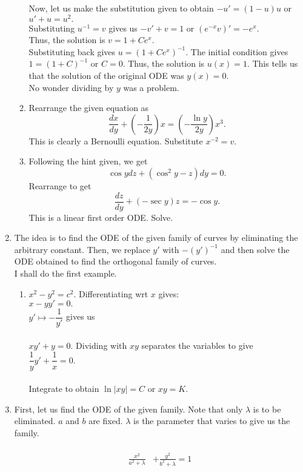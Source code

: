 \documentclass{article}
\begin{document}
\begin{enumerate}[label = Q.\arabic*.]
\begin{enumerate}[label = (\roman*)]
		Now, let us make the substitution given to obtain $-u' = (1 - u)u$ or $u' + u = u^2.$\\
		Substituting $u^{-1} = v$ gives us $-v' + v = 1$ or $(e^{-x}v)' = -e^x.$\\
		Thus, the solution is $v = 1 + Ce^x.$\\
		Substituting back gives $u = (1 + Ce^x)^{-1}.$ The initial condition gives $1 = (1 + C)^{-1}$ or $C = 0.$ Thus, the solution is $u(x) = 1.$ This tells us that the solution of the original ODE was $y(x) = 0.$\\
		No wonder dividing by $y$ was a problem.
		\item Rearrange the given equation as
		\[\frac{dx}{dy} +  \left(-\frac{1}{2y}\right)x = \left(-\frac{\ln y}{2y}\right)x^3.\]
		This is clearly a Bernoulli equation. Substitute $x^{-2} = v.$
		\item Following the hint given, we get
		\[\cos ydz + (\cos^2y - z)dy = 0.\]
		Rearrange to get
		\[\frac{dz}{dy} + \left(-\sec y\right)z = -\cos y.\]
		This is a linear first order ODE. Solve.
	\end{enumerate}
	\item The idea is to find the ODE of the given family of curves by eliminating the arbitrary constant. Then, we replace $y'$ with $-(y')^{-1}$ and then solve the ODE obtained to find the orthogonal family of curves.\\
	I shall do the first example.
	\begin{enumerate}[label = (\roman*)] 
		\item $x^2 - y^2 = c^2.$ Differentiating wrt $x$ gives:\\
		$x - yy' = 0.$\\
		$y' \mapsto -\dfrac{1}{y'}$ gives us\\~\\
		$xy' + y = 0.$ Dividing with $xy$ separates the variables to give\\
		$\dfrac{1}{y}y' + \dfrac{1}{x} = 0.$\\~\\
		Integrate to obtain $\ln|xy| = C$ or $xy = K.$
	\end{enumerate}
	\item First, let us find the ODE of the given family. Note that only $\lambda$ is to be eliminated. $a$ and $b$ are fixed. $\lambda$ is the parameter that varies to give us the family.\\~\\
	\begin{align*} 
		\frac{x^2}{a^2 + \lambda} & + \frac{y^2}{b^2 + \lambda} = 1\\

\end{align*}
\end{enumerate}
\end{document}
